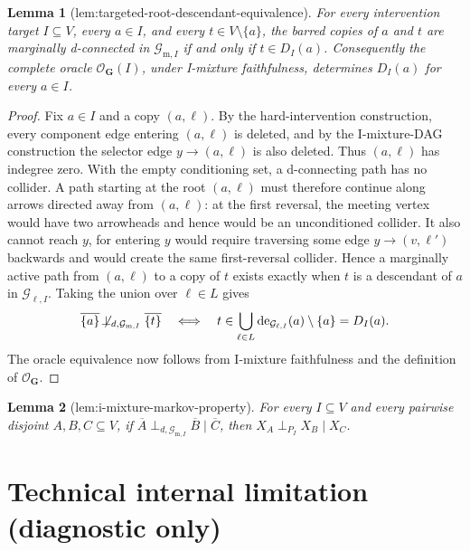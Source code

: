 \documentclass{article}
\newtheorem{lemma}{Lemma}
\begin{document}
\begin{lemma}[lem:targeted-root-descendant-equivalence]\label{lem:targeted-root-descendant-equivalence}
For every intervention target \(I\subseteq V\), every \(a\in I\), and every \(t\in V\setminus\{a\}\), the barred copies of \(a\) and \(t\) are marginally d-connected in \(\mathcal G_{\mathrm m,I}\) if and only if \(t\in D_I(a)\). Consequently the complete oracle \(\mathcal O_{\mathbf G}(I)\), under I-mixture faithfulness, determines \(D_I(a)\) for every \(a\in I\).
\end{lemma}
\begin{proof}
Fix \(a\in I\) and a copy \((a,\ell)\). By the hard-intervention construction, every component edge entering \((a,\ell)\) is deleted, and by the I-mixture-DAG construction the selector edge \(y\to(a,\ell)\) is also deleted. Thus \((a,\ell)\) has indegree zero. With the empty conditioning set, a d-connecting path has no collider. A path starting at the root \((a,\ell)\) must therefore continue along arrows directed away from \((a,\ell)\): at the first reversal, the meeting vertex would have two arrowheads and hence would be an unconditioned collider. It also cannot reach \(y\), for entering \(y\) would require traversing some edge \(y\to(v,\ell')\) backwards and would create the same first-reversal collider. Hence a marginally active path from \((a,\ell)\) to a copy of \(t\) exists exactly when \(t\) is a descendant of \(a\) in \(\mathcal G_{\ell,I}\). Taking the union over \(\ell\in L\) gives
\[
 \overline{\{a\}}\not\!\perp_{d,\mathcal G_{\mathrm m,I}}\overline{\{t\}}
 \quad\Longleftrightarrow\quad
 t\in\bigcup_{\ell\in L}\operatorname{de}_{\mathcal G_{\ell,I}}(a)\setminus\{a\}
 =D_I(a).
\]
The oracle equivalence now follows from I-mixture faithfulness and the definition of \(\mathcal O_{\mathbf G}\).
\end{proof}

\begin{lemma}[lem:i-mixture-markov-property]\label{lem:i-mixture-markov-property}
For every \(I\subseteq V\) and every pairwise disjoint \(A,B,C\subseteq V\), if \(\overline A\perp_{d,\mathcal G_{\mathrm m,I}}\overline B\mid\overline C\), then \(X_A\perp_{P_I}X_B\mid X_C\).
\end{lemma}

\section*{Technical internal limitation (diagnostic only)}
\end{document}
